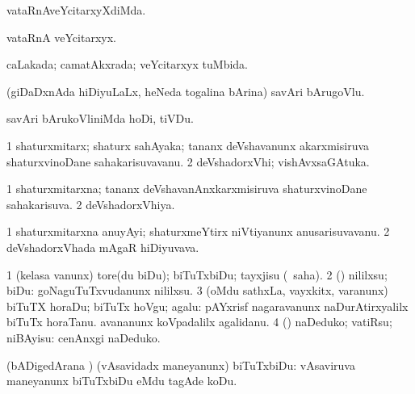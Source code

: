 \bentry
{}
\gl{\kirxvi}
\bmng
vataRnAveYcitarxyXdiMda. 
\emng
\eentry

\bentry
{}
\gl{\nA}
\bmng
vataRnA veYcitarxyx. 
\emng
\eentry

\bentry
{}
\gl{\gu}
\bmng
caLakada; camatAkxrada; veYcitarxyx tuMbida. 
\emng
\eentry

\bentry
{}
\gl{\nA}
\bmng
(giDaDxnAda hiDiyuLaLx, heNeda togalina bArina) savAri bArugoVlu. 
\emng
\eentry

\bentry
{}
\gl{\sakirx}
\bmng
savAri bArukoVliniMda hoDi, tiVDu. 
\emng
\eentry

\bentry
{}
\gl{\nA}
\bmng
\bnum
\num{1} shaturxmitarx; shaturx sahAyaka; tananx deVshavanunx akarxmisiruva shaturx\-vinoDane sahakarisuvavanu. 
\num{2} deVshadorxVhi; vishAvxsaGAtuka. 
\enum
\emng
\eentry

\bentry
{}
\gl{\gu}
\bmng
\bnum
\num{1} shaturxmitarxna; tananx deVshavanAnxkarxmisiruva shaturxvinoDane sahakarisuva. 
\num{2} deVshadorxVhiya. 
\enum
\emng
\eentry

\bentry
{}
\gl{\nA}
\expl{}
\bmng
\bnum
\num{1} shaturxmitarxna anuyAyi; shaturxmeYtirx niVtiyanunx anusarisuvavanu. 
\num{2} deVshadorxVhada mAgaR hiDiyuvava. 
\enum
\emng
\eentry

\bentry
{}
\gl{\kirx}
\bmng
\emng

\noindent
\gl{\sakirx}
\bmng
\bnum
\num{1} (kelasa \mo vanunx) tore(du biDu); biTuTxbiDu; tayxjisu (\akirx\ saha). 
\num{2} (\ame) nililxsu; biDu:  goNaguTuTxvudanunx nililxsu. 
\num{3} (oMdu sathxLa, vayxkitx, \mo varanunx) biTuTX horaDu; biTuTx hoVgu; agalu:  pAYxrisf nagaravanunx naDurAtirxyalilx biTuTx horaTanu.  avananunx koVpadalilx agalidanu. 
\num{4} (\AtAmx) naDeduko; vatiRsu; niBAyisu:  cenAnxgi naDeduko. 
\enum
\emng

\noindent
\gl{\akirx}
\bmng
(bADigedArana \vi) (vAsavidadx maneyanunx) biTuTxbiDu:  vAsaviruva maneyanunx biTuTxbiDu eMdu tagAde koDu. 
\emng

